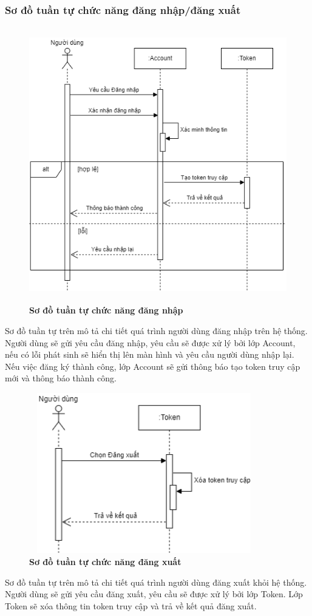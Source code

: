 \subsubsection{Sơ đồ tuần tự chức năng đăng nhập/đăng xuất}
\begin{figure}[H]
  \centering
  \includegraphics[width=13cm,height=12cm]{Images/sequence/sequence_login.png}
  \caption[Sơ đồ tuần tự chức năng đăng nhập]{\bfseries \fontsize{12pt}{0pt}
  \selectfont Sơ đồ tuần tự chức năng đăng nhập}
  \label{sequence_login} %
\end{figure}
Sơ đồ tuần tự trên mô tả chi tiết quá trình người dùng đăng nhập trên hệ thống. Người dùng sẽ gửi yêu cầu đăng nhập, yêu cầu sẽ được xử lý
bởi lớp Account, nếu có lỗi phát sinh sẽ hiển thị lên màn hình và yêu cầu người dùng nhập lại. Nếu việc đăng ký thành công, lớp Account sẽ gửi thông báo 
tạo token truy cập mới và thông báo thành công. 
\begin{figure}[H]
  \centering
  \includegraphics[width=10cm,height=7cm]{Images/sequence/sequence_logout.png}
  \caption[Sơ đồ tuần tự chức năng đăng xuất]{\bfseries \fontsize{12pt}{0pt}
  \selectfont Sơ đồ tuần tự chức năng đăng xuất}
  \label{sequence_logout} %
\end{figure}
Sơ đồ tuần tự trên mô tả chi tiết quá trình người dùng đăng xuất khỏi hệ thống. Người dùng sẽ gửi yêu cầu đăng xuất, yêu cầu sẽ được xử lý
bởi lớp Token. Lớp Token sẽ xóa thông tin token truy cập và trả về kết quả đăng xuất.

